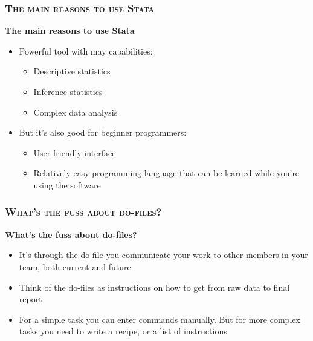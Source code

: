 \documentclass[10pt]{beamer}
\begin{document}
		\begin{frame}
			\frametitle{\textsc{The main reasons to use Stata}}
			\begin{center}
				\Large\textbf{The main reasons to use Stata}
			\end{center}
			\begin{itemize}
				\item Powerful tool with may capabilities:
				
				\begin{itemize}
					\item Descriptive statistics
					
					\item Inference statistics
					
					\item Complex data analysis
					
				\end{itemize}
				
				\item But it’s also good for beginner programmers:
				
				\begin{itemize}
					\item User friendly interface
					
					\item Relatively easy programming language that can be learned while you’re using the software
					
				\end{itemize}
			\end{itemize}
		\end{frame}	

		\begin{frame}
			\frametitle{\textsc{What's the fuss about do-files?}}
			\begin{center}
				\Large\textbf{What's the fuss about do-files?}
			\end{center}
			\begin{itemize}
				\item It’s through the do-file you communicate your work to other members in your team, both current and future
				\item Think of the do-files as instructions on how to get from raw data to final report
				\item For a simple task you can enter commands manually. But for more complex tasks you need to write a recipe, or a list of instructions
				
				\end{itemize}
			\end{frame}
\end{document}
